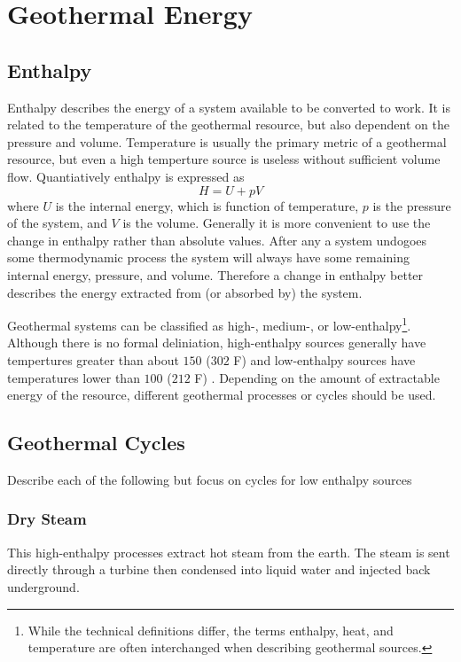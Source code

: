 \chapter{Geothermal Energy}
\label{ch:geothermal}

\section{Enthalpy}
Enthalpy describes the energy of a system available to be converted to work. It is related to the temperature of the geothermal resource, but also dependent on the pressure and volume. Temperature is usually the primary metric of a geothermal resource, but even a high temperture source is useless without sufficient volume flow. Quantiatively enthalpy is expressed as 
\begin{equation}
H = U + pV
\end{equation}
where $U$ is the internal energy, which is function of temperature, $p$ is the pressure of the system, and $V$ is the volume. Generally it is more convenient to use the change in enthalpy rather than absolute values. After any a system undogoes some thermodynamic process the system will always have some remaining internal energy, pressure, and volume. Therefore a change in enthalpy better describes the energy extracted from (or absorbed by) the system.

Geothermal systems can be classified as high-, medium-, or low-enthalpy\footnote{While the technical definitions differ, the terms enthalpy, heat, and temperature are often interchanged when describing geothermal sources.}. Although there is no formal deliniation, high-enthalpy sources generally have tempertures greater than about $150$ \textcelsius{} ($302$ \textdegree{}F) and low-enthalpy sources have temperatures lower than $100$ \textcelsius{} ($212$ \textdegree{}F) \cite{Norden2011}. Depending on the amount of extractable energy of the resource, different geothermal processes or cycles should be used.

\section{Geothermal Cycles}
Describe each of the following but focus on cycles for low enthalpy sources

\subsection{Dry Steam}
This high-enthalpy processes extract hot steam from the earth. The steam is sent directly through a turbine then condensed into liquid water and injected back underground. 

